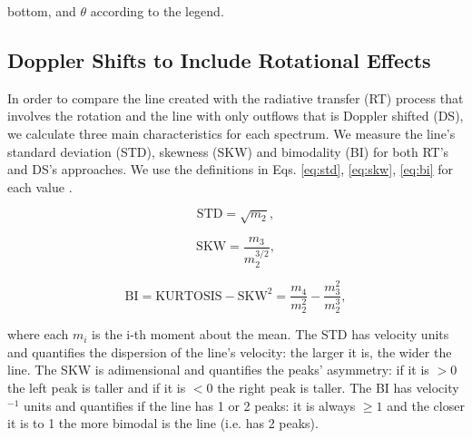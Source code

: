 \documentclass[a4paper,fleqn,usenatbib]{mnras}
\newcommand{\kms}{\ifmmode\mathrm{km\ s}^{-1}\else km s$^{-1}$\fi}
\newcommand{\vrot}{\ifmmode\mathrm V_{\mathrm{rot}}\else $V_{\mathrm{rot}}$~\fi}
\newcommand{\vout}{\ifmmode\mathrm V_{\mathrm{out}}\else $V_{\mathrm{out}}$~\fi}
\newcommand{\tauh}{\ifmmode\mathrm \tau_{\mathrm{H}}\else $\tau_{\mathrm{H}}$~\fi}
\begin{document}
			 bottom, and $\theta$ according to the legend.


\subsection{Doppler Shifts to Include Rotational Effects}




In order to compare the line created with the radiative transfer (RT) process that
involves the rotation and the line with only outflows that is Doppler
shifted (DS), we calculate three main characteristics for each spectrum. We
measure the line's standard deviation (STD), skewness (SKW) and bimodality (BI) 
for both RT's and DS's approaches. We use the definitions in Eqs. \ref{eq:std}, 
\ref{eq:skw}, \ref{eq:bi} for each value \citep{kokoska1999}.

\begin{equation}
\label{eq:std}
\mathrm{STD} = \sqrt{m_2},
\end{equation}

\begin{equation}
\label{eq:skw}
\mathrm{SKW} = \frac{m_3}{m_2^{3/2}},
\end{equation}

\begin{equation}
\label{eq:bi}
\mathrm{BI} = \mathrm{KURTOSIS} - \mathrm{SKW}^2 = \frac{m_4}{m_2^{2}} - \frac{m_3^2}{m_2^{3}},
\end{equation}

where each $m_i$ is the i-th moment about the mean. The STD has velocity units and 
quantifies the dispersion of the line's velocity: the larger it is, the wider the line. 
The SKW is adimensional and quantifies the peaks' asymmetry: if it is $>0$ the left peak is 
taller and if it is $<0$ the right peak is taller. The BI has velocity$^{-1}$ units and
quantifies if the line has 1 or 2 peaks: it is always $\geq 1$ and the closer it is to 1 the more
bimodal is the line (i.e. has 2 peaks).
\end{document}
